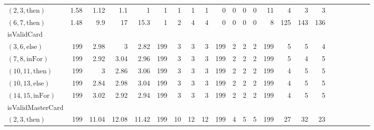\documentclass[sigconf]{acmart}
\newcommand{\thenBr}{\text{then}}
\newcommand{\elseBr}{\text{else}}
\newcommand{\inFor}{\text{inFor}}
\begin{document}
\begin{table*}
{\begin{tabular}{l|rrrr|rrrr|rrrr|rrrr|r|r|r|r|r|r}
    $(2,3,\thenBr)$   & 1.58        & 1.12        & 1.1            & 1             & 1     & 1     & 1       & 1       & 0        & 0        & 0          & 0           & 11       & 4       & 3          & 3 & & & & & & \\
    $(6,7,\thenBr)$   & 1.48        & 9.9         & 17             & 15.3          & 1     & 2     & 4       & 4       & 0        & 0        & 0          & 0           & 8        & 125     & 143        & 136 & & & & & & \\
    \midrule
    \midrule
    isValidCard       &             &             &                &               &       &       &         &         &          &          &            &             &          &         &            & & & & & & & \\ 
    $(3,6,\elseBr)$   & 199         & 2.98        & 3              & 2.82          & 199   & 3     & 3       & 3       & 199      & 2        & 2          & 2           & 199      & 5       & 5          & 4 & & & & & & \\
    $(7,8,\inFor)$    & 199         & 2.92        & 3.04           & 2.96          & 199   & 3     & 3       & 3       & 199      & 2        & 2          & 2           & 199      & 5       & 4          & 5 & & & & & & \\
    $(10,11,\thenBr)$ & 199         & 3           & 2.86           & 3.06          & 199   & 3     & 3       & 3       & 199      & 2        & 2          & 2           & 199      & 4       & 5          & 5 & & & & & & \\
    $(10,13,\elseBr)$ & 199         & 2.84        & 2.98           & 3.04          & 199   & 3     & 3       & 3       & 199      & 2        & 2          & 2           & 199      & 4       & 5          & 5 & & & & & & \\
    $(14,15,\inFor)$  & 199         & 3.02        & 2.92           & 2.94          & 199   & 3     & 3       & 3       & 199      & 2        & 2          & 2           & 199      & 4       & 5          & 5 & & & & & & \\
    \midrule
    isValidMasterCard & \multicolumn{16}{l}{} \\ 
    $(2,3,\thenBr)$   & 199         & 11.04       & 12.08          & 11.42         & 199   & 10    & 12      & 12      & 199      & 4        & 5          & 5           & 199      & 27      & 32         & 23 & & & & & & \\

\end{tabular}}
\end{table*}
\end{document}
